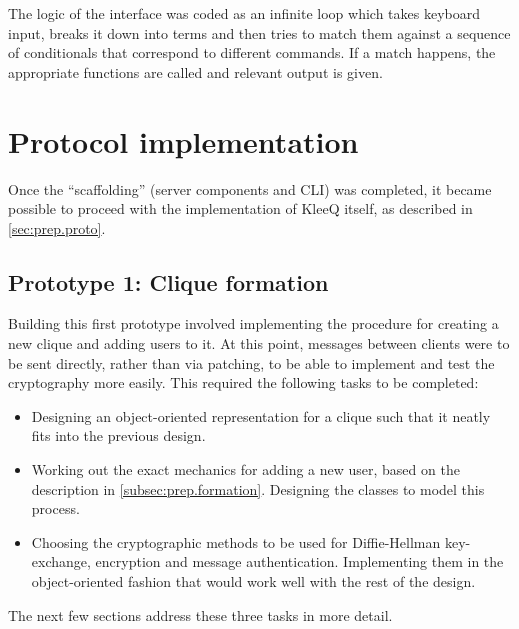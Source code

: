 \documentclass[a4paper, twoside, 12pt]{report}
\begin{document}
The logic of the interface was coded as an infinite loop which takes keyboard input, breaks it down into terms and then tries to match them against a sequence of conditionals that correspond to different commands. If a match happens, the appropriate functions are called and relevant output is given.


\section{Protocol implementation}
\label{sec:impl.proto}
Once the ``scaffolding'' (server components and CLI) was completed, it became possible to proceed with the implementation of KleeQ itself, as described in \cref{sec:prep.proto}.


\subsection{Prototype 1: Clique formation}
\label{subsec:impl.proto.formation}
Building this first prototype involved implementing the procedure for creating a new clique and adding users to it. At this point, messages between clients were to be sent directly, rather than via patching, to be able to implement and test the cryptography more easily. This required the following tasks to be completed:

\begin{itemize}
    \item Designing an object-oriented representation for a clique such that it neatly fits into the previous design.
    \item Working out the exact mechanics for adding a new user, based on the description in \cref{subsec:prep.formation}. Designing the classes to model this process.
    \item Choosing the cryptographic methods to be used for Diffie-Hellman key-exchange, encryption and message authentication. Implementing them in the object-oriented fashion that would work well with the rest of the design.
\end{itemize}

The next few sections address these three tasks in more detail.
\end{document}

